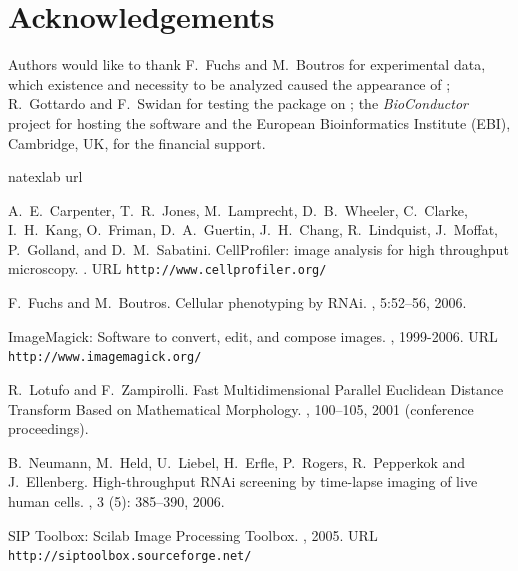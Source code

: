 \section*{Acknowledgements}

Authors would like to thank F.~Fuchs and M.~Boutros for experimental data, which existence and necessity to be analyzed caused the appearance of \EBImage; R.~Gottardo and F.~Swidan for testing the package on ; the {\em BioConductor} project for hosting the software and the European Bioinformatics Institute (EBI), Cambridge, UK, for the financial support.

\begin{thebibliography}{1}
\expandafter\ifx\csname natexlab\endcsname\relax\def\natexlab#1{#1}\fi
\expandafter\ifx\csname url\endcsname\relax
  \def\url#1{{\tt #1}}\fi

    A.~E.~Carpenter, T.~R.~Jones, M.~Lamprecht, D.~B.~Wheeler, C.~Clarke, I.~H.~Kang, O.~Friman, D.~A.~Guertin, J.~H.~Chang, R.~Lindquist, J.~Moffat, P.~Golland, and D.~M.~Sabatini.
    \newblock CellProfiler: image analysis for high throughput microscopy.
    .
    \newblock URL \url{http://www.cellprofiler.org/}

    F.~Fuchs and M.~Boutros.
    \newblock Cellular phenotyping by RNAi.
    , 5:52--56, 2006.

    ImageMagick: Software to convert, edit, and compose images.
    , 1999-2006.
    \newblock URL \url{http://www.imagemagick.org/}

    R.~Lotufo and F.~Zampirolli.
    \newblock Fast Multidimensional Parallel Euclidean Distance Transform Based on Mathematical Morphology.
    , 100--105, 2001 (conference proceedings).

    B.~Neumann, M.~Held, U.~Liebel, H.~Erfle, P.~Rogers, R.~Pepperkok and J.~Ellenberg.
    \newblock High-throughput RNAi screening by time-lapse imaging of live human cells.
    , 3 (5): 385--390, 2006.

    SIP Toolbox: Scilab Image Processing Toolbox.
    , 2005.
    \newblock URL \url{http://siptoolbox.sourceforge.net/}

\end{thebibliography}
